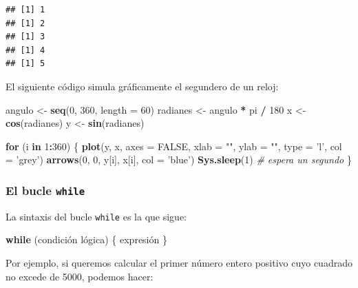 \documentclass[]{book}
\newenvironment{Shaded}{\begin{snugshade}}{\end{snugshade}}
\newcommand{\KeywordTok}[1]{\textcolor[rgb]{0.13,0.29,0.53}{\textbf{#1}}}
\newcommand{\DataTypeTok}[1]{\textcolor[rgb]{0.13,0.29,0.53}{#1}}
\newcommand{\DecValTok}[1]{\textcolor[rgb]{0.00,0.00,0.81}{#1}}
\newcommand{\StringTok}[1]{\textcolor[rgb]{0.31,0.60,0.02}{#1}}
\newcommand{\CommentTok}[1]{\textcolor[rgb]{0.56,0.35,0.01}{\textit{#1}}}
\newcommand{\OtherTok}[1]{\textcolor[rgb]{0.56,0.35,0.01}{#1}}
\newcommand{\ControlFlowTok}[1]{\textcolor[rgb]{0.13,0.29,0.53}{\textbf{#1}}}
\newcommand{\OperatorTok}[1]{\textcolor[rgb]{0.81,0.36,0.00}{\textbf{#1}}}
\newcommand{\NormalTok}[1]{#1}
\begin{document}
\begin{verbatim}
## [1] 1
## [1] 2
## [1] 3
## [1] 4
## [1] 5
\end{verbatim}

El siguiente código simula gráficamente el segundero de un reloj:

\begin{Shaded}
\begin{Highlighting}[]
\NormalTok{angulo <-}\StringTok{ }\KeywordTok{seq}\NormalTok{(}\DecValTok{0}\NormalTok{, }\DecValTok{360}\NormalTok{, }\DataTypeTok{length =} \DecValTok{60}\NormalTok{)}
\NormalTok{radianes <-}\StringTok{ }\NormalTok{angulo }\OperatorTok{*}\StringTok{ }\NormalTok{pi }\OperatorTok{/}\StringTok{ }\DecValTok{180}
\NormalTok{x <-}\StringTok{ }\KeywordTok{cos}\NormalTok{(radianes)}
\NormalTok{y <-}\StringTok{ }\KeywordTok{sin}\NormalTok{(radianes)}

\ControlFlowTok{for}\NormalTok{ (i }\ControlFlowTok{in} \DecValTok{1}\OperatorTok{:}\DecValTok{360}\NormalTok{) \{}
  \KeywordTok{plot}\NormalTok{(y, x, }\DataTypeTok{axes =} \OtherTok{FALSE}\NormalTok{, }\DataTypeTok{xlab =} \StringTok{""}\NormalTok{, }\DataTypeTok{ylab =} \StringTok{""}\NormalTok{, }\DataTypeTok{type =} \StringTok{'l'}\NormalTok{, }\DataTypeTok{col =} \StringTok{'grey'}\NormalTok{)}
  \KeywordTok{arrows}\NormalTok{(}\DecValTok{0}\NormalTok{, }\DecValTok{0}\NormalTok{, y[i], x[i], }\DataTypeTok{col =} \StringTok{'blue'}\NormalTok{)}
  \KeywordTok{Sys.sleep}\NormalTok{(}\DecValTok{1}\NormalTok{) }\CommentTok{# espera un segundo}
\NormalTok{\}}
\end{Highlighting}
\end{Shaded}

\subsubsection{\texorpdfstring{El bucle
\texttt{while}}{El bucle while}}\label{el-bucle-while}

La sintaxis del bucle \texttt{while} es la que sigue:

\begin{Shaded}
\begin{Highlighting}[]
\ControlFlowTok{while}\NormalTok{ (condición lógica)  \{ expresión \}}
\end{Highlighting}
\end{Shaded}

Por ejemplo, si queremos calcular el primer número entero positivo cuyo
cuadrado no excede de 5000, podemos hacer:
\end{document}
